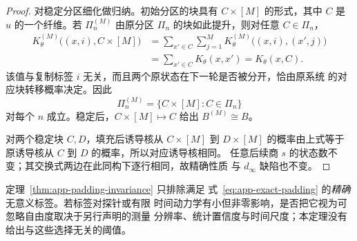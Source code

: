 \begin{proof}
对稳定分区细化做归纳。初始分区的块具有
$C\times[M]$ 的形式，其中 $C$ 是 $u$ 的一个纤维。若 $\Pi_n^{(M)}$
由原分区 $\Pi_n$ 的块如此提升，则对任意 $C\in\Pi_n$，
\begin{align*}
 K_\theta^{(M)}\bigl((x,i),C\times[M]\bigr)
 &=\sum_{x'\in C}\sum_{j=1}^M
   K_\theta^{(M)}\bigl((x,i),(x',j)\bigr)\\
 &=\sum_{x'\in C}K_\theta(x,x')
 =K_\theta(x,C).
\end{align*}
该值与复制标签 $i$ 无关，而且两个原状态在下一轮是否被分开，恰由原系统
的对应块转移概率决定。因此
\[
  \Pi_n^{(M)}=\{C\times[M]:C\in\Pi_n\}
\]
对每个 $n$ 成立。稳定后，$C\times[M]\mapsto C$ 给出
$B^{(M)}\cong B$。

对两个稳定块 $C,D$，填充后诱导核从 $C\times[M]$ 到 $D\times[M]$
的概率由上式等于原诱导核从 $C$ 到 $D$ 的概率，所以对应诱导核相同。
任意后续商 $s$ 的状态数不变；其交换式两边在此同构下逐行相同，故精确性质
与 $d_\infty$ 缺陷也不变。
\end{proof}

定理~\ref{thm:app-padding-invariance} 只排除满足
式~\eqref{eq:app-exact-padding} 的\emph{精确}无意义标签。若标签对探针或有限
时间动力学有小但非零影响，是否把它视为可忽略自由度取决于另行声明的测量
分辨率、统计置信度与时间尺度；本定理没有给出与这些选择无关的阈值。
